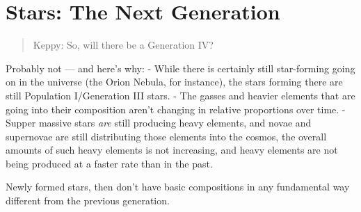 \documentclass[
  letterpaper,
]{book}
\begin{document}
\section{Stars: The Next Generation}\label{stars-the-next-generation}

\begin{quote}
Keppy: So, will there be a Generation IV?
\end{quote}

Probably not --- and here's why: - While there is certainly still
star-forming going on in the universe (the Orion Nebula, for instance),
the stars forming there are still Population I/Generation III stars. -
The gasses and heavier elements that are going into their composition
aren't changing in relative proportions over time. - Supper massive
stars \emph{are} still producing heavy elements, and novae and
supernovae are still distributing those elements into the cosmos, the
overall amounts of such heavy elements is not increasing, and heavy
elements are not being produced at a faster rate than in the past.

Newly formed stars, then don't have basic compositions in any
fundamental way different from the previous generation.
\end{document}
